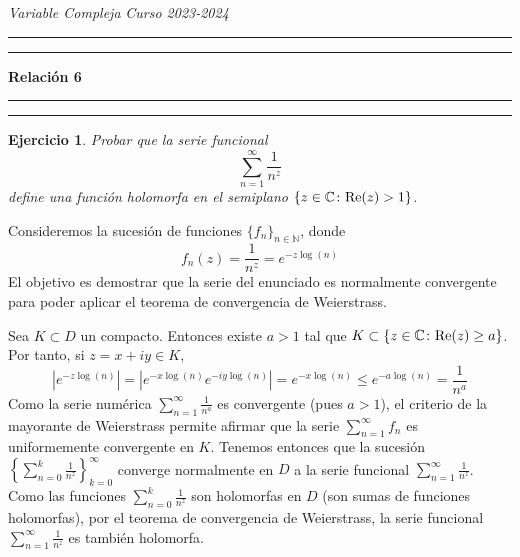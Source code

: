 \documentclass[11pt]{report}
\makeatletter
\renewenvironment{proof}[1][\proofname]{\par
  \pushQED{\qed}%
  \normalfont \topsep\z@skip %
  \trivlist
  \item[\hskip\labelsep
        \itshape
    #1\@addpunct{.}]\ignorespaces
}{%
  \popQED\endtrivlist\@endpefalse
}
\newcommand{\N}{\mathbb N}
\newcommand{\C}{\mathbb C}
\newtheorem{ejercicio}{Ejercicio}
\makeatother
\begin{document}


\textit{Variable Compleja} \hfill \textit{Curso 2023-2024}

\vspace{-5mm}

\begin{center}

	\rule{\textwidth}{1.6pt}\vspace*{-\baselineskip}\vspace*{2pt} %
	\rule{\textwidth}{0.4pt} %
	
	{\LARGE \textbf{Relación 6}} %
	
	\rule[0.66\baselineskip]{\textwidth}{0.4pt}\vspace*{-\baselineskip}\vspace{3.2pt} %
	\rule[0.66\baselineskip]{\textwidth}{1.6pt} %

\end{center}


\begin{ejercicio}
  Probar que la serie funcional
  \[\sum_{n=1}^\infty \frac{1}{n^z}\]
  define una función holomorfa en el semiplano $\{z \in \C \colon \textup{Re}(z) > 1\}$.
\end{ejercicio}

\begin{proof}
    Consideremos la sucesión de funciones $\{f_n\}_{n \in \N}$, donde
    \[f_n(z) = \frac{1}{n^z} = e^{-z\log(n)}\]
    El objetivo es demostrar que la serie del enunciado es normalmente convergente para poder aplicar el teorema de convergencia de Weierstrass.

    Sea $K \subset D$ un compacto. Entonces existe $a > 1$ tal que $K \subset \{z \in \C \colon \textup{Re}(z) \geq a \}$. Por tanto, si $z=x+iy \in K$,
    \[|e^{-z\log(n)}| = |e^{-x\log(n)}e^{-iy\log(n)}| = e^{-x\log(n)} \leq e^{-a\log(n)} = \frac{1}{n^a}\]
    Como la serie numérica $\sum_{n=1}^\infty \frac{1}{n^a}$ es convergente (pues $a>1$), el criterio de la mayorante de Weierstrass permite afirmar que la serie $\sum_{n=1}^\infty f_n$ es uniformemente convergente en $K$. Tenemos entonces que la sucesión $\left\{\sum_{n= 0}^k \frac{1}{n^z}\right\}_{k= 0}^\infty$
    converge normalmente en $D$ a la serie funcional $\sum_{n=1}^\infty \frac{1}{n^z}$.
    Como las funciones $\sum_{n= 0}^k \frac{1}{n^z}$ son holomorfas en $D$ (son sumas de funciones holomorfas), por el teorema de convergencia de Weierstrass, la serie funcional $\sum_{n=1}^\infty \frac{1}{n^z}$ es también holomorfa.
\end{proof}
\end{document}
